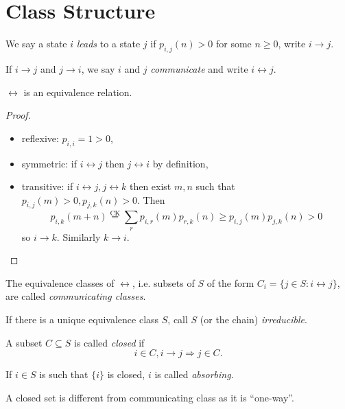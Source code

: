 \documentclass[a4paper]{article}
\newcommand*{\tot}{\leftrightarrow}
\begin{document}
\section{Class Structure}

\begin{definition}
  We say a state \(i\) \emph{leads} to a state \(j\) if \(p_{i,j}(n) > 0\) for some \(n\geq0\), write \(i \to j\).
  
  If \(i\to j\) and \(j\to i\), we say \(i\) and \(j\) \emph{communicate} and write \(i \tot j\).
\end{definition}

\begin{proposition}
  \(\tot\) is an equivalence relation.
\end{proposition}

\begin{proof}\leavevmode
  \begin{itemize}
  \item reflexive: \(p_{i,i}=1>0\),
  \item symmetric: if \(i\tot j\) then \(j\tot i\) by definition,
  \item transitive: if \(i\tot j, j\tot k\) then exist \(m, n\) such that \(p_{i,j}(m)>0, p_{j,k}(n)>0\). Then
    \[
      p_{i,k}(m+n) \stackrel{\text{CK}}{=} \sum_{r}^{ }p_{i,r}(m)p_{r,k}(n) \geq p_{i,j}(m)p_{j,k}(n) >0
      \]
      so \(i\to k\). Similarly \(k\to i\).
  \end{itemize}
\end{proof}

\begin{definition}
The equivalence classes of \(\tot\), i.e. subsets of \(S\) of the form \(C_i=\{j\in S: i\tot j\}\), are called \emph{communicating classes}.
\end{definition}

\begin{definition}
  If there is a unique equivalence class \(S\), call \(S\) (or the chain) \emph{irreducible}.
\end{definition}

\begin{definition}
  A subset \(C \subseteq S\) is called \emph{closed} if
  \[
i\in C, i\to j \Rightarrow j\in C.
\]

  If \(i \in S\) is such that \(\{i\}\) is closed, \(i\) is called \emph{absorbing}.
\end{definition}

A closed set is different from communicating class as it is ``one-way''.
\end{document}
